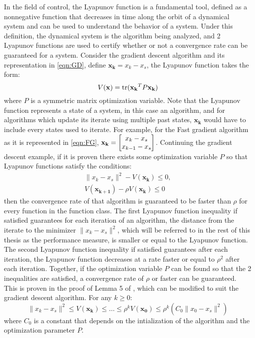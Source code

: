 In the field of control, the Lyapunov function is a fundamental tool, defined as a nonnegative function that decreases in time along the orbit of a dynamical system and can be used to understand the behavior of a system. Under this definition, the dynamical system is the algorithm being analyzed, and 2 Lyapunov functions are used to certify whether or not a convergence rate can be guaranteed for a system. Consider the gradient descent algorithm and its representation in \eqref{eqn:GD}, define $\mathbf{x_k} = x_k - x_s$, the Lyapunov function takes the form:
\begin{equation}
	V(\mathbf{x}) = \operatorname{\mathrm{tr}}(\mathbf{x_k}^TP\mathbf{x_k}) \label{eqn:Lyapunov}
\end{equation}
where $P$ is a symmetric matrix optimization variable. Note that the Lyapunov function represents a state of a system, in this case an algorithm, and for algorithms which update its iterate using multiple past states, $\mathbf{x_k}$ would have to include every states used to iterate. For example, for the Fast gradient algorithm as it is represented in \eqref{eqn:FG}, $\mathbf{x_k} = \begin{bmatrix}x_{k} - x_s \\ x_{k-1} - x_s\end{bmatrix}$. Continuing the gradient descent example, if it is proven there exists some optimization variable $P$ so that Lyapunov functions satisfy the conditions:
\begin{subequations} \label{eqn:Ly_ineq}
	\begin{align}
	  \|x_k - x_s\|^2 - V(\mathbf{x_k}) \leq 0,      \\
	  V(\mathbf{x_{k+1}}) - \rho V(\mathbf{x_k}) \leq 0
	\end{align}
\end{subequations}
then the convergence rate of that algorithm is guaranteed to be faster than $\rho $ for every function in the function class. The first Lyapunov function inequality if satisfied guarantees for each iteration of an algorithm, the distance from the iterate to the minimizer $\|x_k - x_s\|^2$, which will be referred to in the rest of this thesis as the performance measure, is smaller or equal to the Lyapunov function. The second Lyapunov function inequality if satisfied guarantees after each iteration, the Lyapunov function decreases at a rate faster or equal to $\rho^2$ after each iteration. Together, if the optimization variable $P$ can be found so that the 2 inequalities are satisfied, a convergence rate of $\rho$ or faster can be guaranteed. This is proven in the proof of Lemma 5 of \cite{tutorial}, which can be modified to suit the gradient descent algorithm. For any $k \geq 0$:
\begin{equation}
	\|x_k - x_s\|^2 \leq V(\mathbf{x_{k}}) \leq \ldots \leq \rho^{k}V(\mathbf{x_{0}}) \leq \rho^k(C_0\|x_0 - x_s\|^2)
\end{equation}
where $C_0$ is a constant that depends on the intialization of the algorithm and the optimization parameter $P$.

